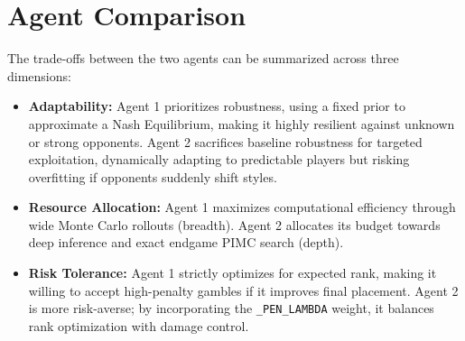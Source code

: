 \documentclass{article}
\begin{document}
\section{Agent Comparison}
The trade-offs between the two agents can be summarized across three dimensions:
\begin{itemize}
    \item \textbf{Adaptability:} Agent 1 prioritizes robustness, using a fixed prior to approximate a Nash Equilibrium, making it highly resilient against unknown or strong opponents. Agent 2 sacrifices baseline robustness for targeted exploitation, dynamically adapting to predictable players but risking overfitting if opponents suddenly shift styles.
    \item \textbf{Resource Allocation:} Agent 1 maximizes computational efficiency through wide Monte Carlo rollouts (breadth). Agent 2 allocates its budget towards deep inference and exact endgame PIMC search (depth).
    \item \textbf{Risk Tolerance:} Agent 1 strictly optimizes for expected rank, making it willing to accept high-penalty gambles if it improves final placement. Agent 2 is more risk-averse; by incorporating the \texttt{\_PEN\_LAMBDA} weight, it balances rank optimization with damage control.
\end{itemize}
\end{document}
